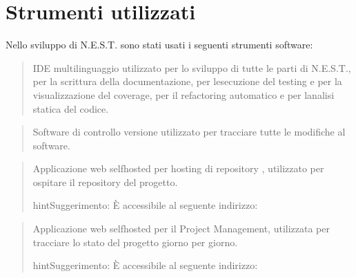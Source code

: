 \documentclass[letterpaper,10pt,italian]{sphinxmanual}
\begin{document}
\noindent{}

\noindent{}

\noindent{}

\noindent{}

\noindent{}


\chapter{Strumenti utilizzati}
\label{\detokenize{development/tools:strumenti-utilizzati}}\label{\detokenize{development/tools::doc}}
\sphinxAtStartPar
Nello sviluppo di N.E.S.T. sono stati usati i seguenti strumenti software:

\sphinxAtStartPar
{}
\begin{quote}

\sphinxAtStartPar
IDE multilinguaggio utilizzato per lo sviluppo di tutte le parti di N.E.S.T., per la scrittura della documentazione,
per l\textquotesingle{}esecuzione del testing e per la visualizzazione del coverage, per il refactoring automatico e per l\textquotesingle{}analisi
statica del codice.
\end{quote}

\sphinxAtStartPar
{}
\begin{quote}

\sphinxAtStartPar
Software di controllo versione utilizzato per tracciare tutte le modifiche al software.
\end{quote}

\sphinxAtStartPar
{}
\begin{quote}

\sphinxAtStartPar
Applicazione web self\sphinxhyphen{}hosted per hosting di repository , utilizzato per ospitare il repository del progetto.

\begin{sphinxadmonition}{hint}{Suggerimento:}
\sphinxAtStartPar
È accessibile al seguente indirizzo: 
\end{sphinxadmonition}
\end{quote}

\sphinxAtStartPar
{}
\begin{quote}

\sphinxAtStartPar
Applicazione web self\sphinxhyphen{}hosted per il Project Management, utilizzata per tracciare lo stato del progetto giorno per
giorno.

\begin{sphinxadmonition}{hint}{Suggerimento:}
\sphinxAtStartPar
È accessibile al seguente indirizzo: 
\end{sphinxadmonition}
\end{quote}
\end{document}
